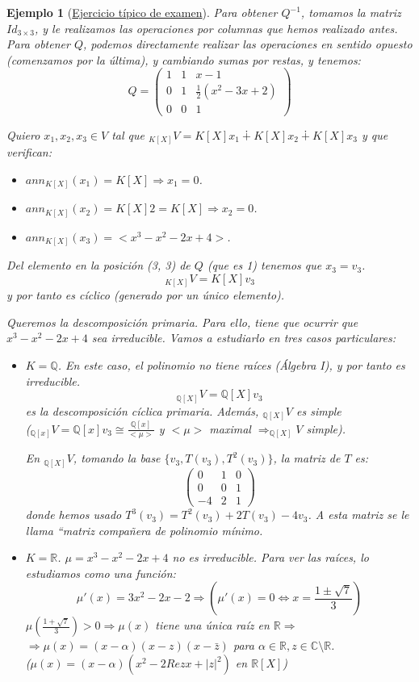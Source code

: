 \documentclass[11pt,a4paper]{article}
\theoremstyle{break}
\newtheorem{example}[theorem]{Ejemplo}
\begin{document}
\begin{example}[\underline{Ejercicio típico de examen}]
Para obtener $Q^{-1}$, tomamos la matriz $Id_{3 \times 3}$, y le realizamos las operaciones por columnas que hemos realizado antes. Para obtener $Q$, podemos directamente realizar las operaciones en sentido opuesto (comenzamos por la última), y cambiando sumas por restas, y tenemos:
$$Q = \begin{pmatrix}
1 & 1 & x-1 \\
0 & 1 & \frac{1}{2}(x^{2}-3x+2) \\
0 & 0 & 1
\end{pmatrix}$$

Quiero $x_{1}, x_{2}, x_{3} \in V$ tal que $_{K[X]}V = K[X]x_{1} \dotplus K[X]x_{2} \dotplus K[X]x_{3}$ y que verifican:
\begin{itemize}
\item $ann_{K[X]}(x_{1}) = K[X] \Rightarrow x_{1} = 0$.
\item $ann_{K[X]}(x_{2}) = K[X]2 = K[X] \Rightarrow x_{2} = 0$.
\item $ann_{K[X]}(x_{3}) = <x^{3}-x^{2}-2x+4>$.
\end{itemize}
Del elemento en la posición (3, 3) de $Q$ (que es 1) tenemos que $x_{3} = v_{3}$.
$$_{K[X]}V = K[X]v_{3}$$
y por tanto es cíclico (generado por un único elemento).

Queremos la descomposición primaria. Para ello, tiene que ocurrir que $x^{3}-x^{2}-2x+4$ sea irreducible. Vamos a estudiarlo en tres casos particulares:
\begin{itemize}
\item $K = \mathbb{Q}$. En este caso, el polinomio no tiene raíces (Álgebra I), y por tanto es irreducible.
$$_{\mathbb{Q}[X]}V = \mathbb{Q}[X]v_{3}$$
es la descomposición cíclica primaria. Además, $_{\mathbb{Q}[X]}V$ es simple \\ ($_{\mathbb{Q}[x]}V = \mathbb{Q}[x]v_{3} \cong \frac{\mathbb{Q}[x]}{<\mu>}$ y $<\mu>$ maximal $\Rightarrow _{\mathbb{Q}[X]}V$ simple).

En $_{\mathbb{Q}[X]}V$, tomando la base $\{v_{3}, T(v_{3}), T^{2}(v_{3})\}$, la matriz de $T$ es:
$$\begin{pmatrix}
0 & 1 & 0 \\
0 & 0 & 1 \\
-4 & 2 & 1
\end{pmatrix}$$
donde hemos usado $T^{3}(v_{3}) = T^{2}(v_{3}) + 2T(v_{3}) - 4v_{3}$. A esta matriz se le llama ``matriz compañera de polinomio mínimo.
\item $K = \mathbb{R}$. $\mu = x^{3}-x^{2}-2x+4$ no es irreducible. Para ver las raíces, lo estudiamos como una función:
$$\mu'(x) = 3x^{2}-2x-2 \Rightarrow (\mu'(x) = 0 \iff x = \frac{1 \pm \sqrt{7}}{3})$$
$\mu(\frac{1+\sqrt{7}}{3}) > 0 \Rightarrow \mu(x)$ tiene una única raíz en $\mathbb{R} \Rightarrow$ \\ $\Rightarrow \mu(x) = (x - \alpha)(x - z)(x - \bar{z})$ para $\alpha \in \mathbb{R}, z \in \mathbb{C} \setminus \mathbb{R}$. \\
($\mu(x) = (x - \alpha)(x^{2} - 2 Re z x + |z|^{2})$ en $\mathbb{R}[X]$)


\end{itemize}
\end{example}
\end{document}
